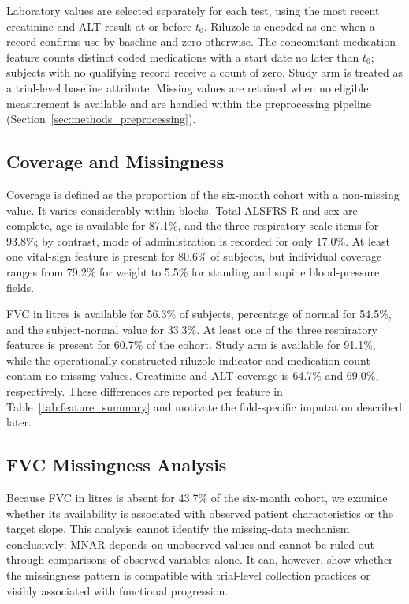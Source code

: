 Laboratory values are selected separately for each test, using the most recent creatinine and \gls{ALT} result at or before $t_0$. Riluzole is encoded as one when a record confirms use by baseline and zero otherwise. The concomitant-medication feature counts distinct coded medications with a start date no later than $t_0$; subjects with no qualifying record receive a count of zero. Study arm is treated as a trial-level baseline attribute. Missing values are retained when no eligible measurement is available and are handled within the preprocessing pipeline (Section~\ref{sec:methods_preprocessing}).

\subsection{Coverage and Missingness}
\label{sec:methods_coverage}
Coverage is defined as the proportion of the six-month cohort with a non-missing value. It varies considerably within blocks. Total \gls{ALSFRS-R} and sex are complete, age is available for 87.1\%, and the three respiratory scale items for 93.8\%; by contrast, mode of administration is recorded for only 17.0\%. At least one vital-sign feature is present for 80.6\% of subjects, but individual coverage ranges from 79.2\% for weight to 5.5\% for standing and supine blood-pressure fields.

FVC in litres is available for 56.3\% of subjects, percentage of normal for 54.5\%, and the subject-normal value for 33.3\%. At least one of the three respiratory features is present for 60.7\% of the cohort. Study arm is available for 91.1\%, while the operationally constructed riluzole indicator and medication count contain no missing values. Creatinine and \gls{ALT} coverage is 64.7\% and 69.0\%, respectively. These differences are reported per feature in Table~\ref{tab:feature_summary} and motivate the fold-specific imputation described later.

\subsection{FVC Missingness Analysis}
\label{subsec:methods_fvc_missingness}
Because FVC in litres is absent for 43.7\% of the six-month cohort, we examine whether its availability is associated with observed patient characteristics or the target slope. This analysis cannot identify the missing-data mechanism conclusively: \gls{MNAR} depends on unobserved values and cannot be ruled out through comparisons of observed variables alone. It can, however, show whether the missingness pattern is compatible with trial-level collection practices or visibly associated with functional progression.

